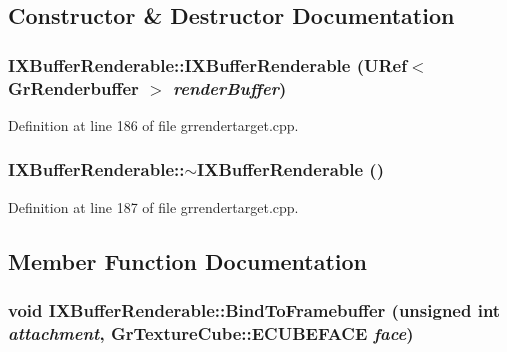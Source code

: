 \subsection{Constructor \& Destructor Documentation}
\hypertarget{class_i_x_buffer_renderable_e2381dc16013acf17fb4417ed3cdc3e3}{
\subsubsection[{IXBufferRenderable}]{\setlength{\rightskip}{0pt plus 5cm}IXBufferRenderable::IXBufferRenderable ({\bf URef}$<$ {\bf GrRenderbuffer} $>$ {\em renderBuffer})}}
\label{class_i_x_buffer_renderable_e2381dc16013acf17fb4417ed3cdc3e3}




Definition at line 186 of file grrendertarget.cpp.\hypertarget{class_i_x_buffer_renderable_13a0d38a1330f0a9294a71b6a0773255}{
\subsubsection[{$\sim$IXBufferRenderable}]{\setlength{\rightskip}{0pt plus 5cm}IXBufferRenderable::$\sim$IXBufferRenderable ()}}
\label{class_i_x_buffer_renderable_13a0d38a1330f0a9294a71b6a0773255}




Definition at line 187 of file grrendertarget.cpp.

\subsection{Member Function Documentation}
\hypertarget{class_i_x_buffer_renderable_87a8640a85c1d83ac4339a3d54897432}{
\subsubsection[{BindToFramebuffer}]{\setlength{\rightskip}{0pt plus 5cm}void IXBufferRenderable::BindToFramebuffer (unsigned int {\em attachment}, \/  {\bf GrTextureCube::ECUBEFACE} {\em face})}}
\label{class_i_x_buffer_renderable_87a8640a85c1d83ac4339a3d54897432}




